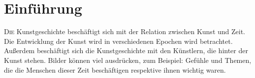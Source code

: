 \section{Einführung}
\lettrine{D}{ie} Kunstgeschichte beschäftigt sich mit der Relation zwischen Kunst und Zeit.
Die Entwicklung der Kunst wird in verschiedenen Epochen wird betrachtet.
Außerdem beschäftigt sich die Kunstgeschichte mit den Künstlern, die hinter der Kunst
stehen. Bilder können viel ausdrücken, zum Beispiel: Gefühle und Themen, die die Menschen dieser Zeit beschäftigen
respektive ihnen wichtig waren.

